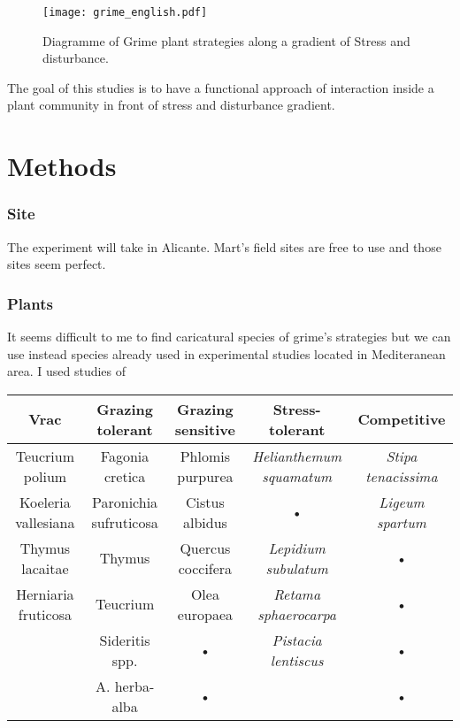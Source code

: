 \documentclass[12pt]{article} %
\begin{document}
\begin{figure}
\begin{center}
\texttt{[image: grime\_english.pdf]}
\end{center}
\caption{Diagramme of Grime plant strategies along a gradient of Stress and disturbance.\label{Grime}}
\end{figure}



The goal of this studies is to have a functional approach of interaction inside a plant community in front of stress and disturbance gradient.


\part{Methods}

\section{Site}

The experiment will take in Alicante. Mart's field sites are free to use and those sites seem perfect.

\section{Plants}

It seems difficult to me to find caricatural species of grime's strategies but we can use instead species already used in experimental studies located in Mediteranean area.
I used studies of \citep{McCluney2012,Navarro2006, Jauffret2003}

\begin{tabular}{|c|c|c|c|c|}
\hline 
Vrac & Grazing tolerant & Grazing sensitive & Stress-tolerant & Competitive \\ 
\hline 
Teucrium polium & Fagonia cretica & Phlomis purpurea & \textit{Helianthemum squamatum} & \textit{Stipa tenacissima} \\ 
\hline 
Koeleria vallesiana & Paronichia sufruticosa & Cistus albidus & • & \textit{Ligeum spartum} \\ 
\hline 
Thymus lacaitae & Thymus & Quercus coccifera  & \textit{Lepidium subulatum} & • \\ 
\hline 
Herniaria fruticosa & Teucrium & Olea europaea & \textit{Retama sphaerocarpa} & • \\ 
\hline
 & Sideritis spp. & • & \textit{Pistacia lentiscus} & • \\ 
\hline
 & A. herba-alba & • &  & • \\ 
\hline
\end{tabular} 
\end{document}
